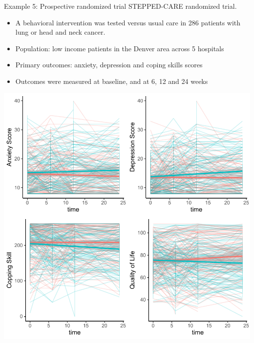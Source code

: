 \documentclass[
  9pt,
  ignorenonframetext,
]{beamer}
\providecommand{\tightlist}{%
  \setlength{\itemsep}{0pt}\setlength{\parskip}{0pt}}
\begin{document}
\begin{frame}{}
\protect\hypertarget{section-4}{}
\begin{block}{Example 5: Prospective randomized trial}
\protect\hypertarget{example-5-prospective-randomized-trial}{}
STEPPED-CARE randomized trial.

\begin{itemize}
\tightlist
\item
  A behavioral intervention was tested versus usual care in 286 patients
  with lung or head and neck cancer.\\
\item
  Population: low income patients in the Denver area across 5 hospitals
\item
  Primary outcomes: anxiety, depression and coping skills scores
\item
  Outcomes were measured at baseline, and at 6, 12 and 24 weeks
\end{itemize}

\vspace{5mm}

\tiny

\begin{center}\includegraphics[width=0.5\linewidth]{figs_L1/unnamed-chunk-2-1} \end{center}

\tiny
\end{block}
\end{frame}
\end{document}
